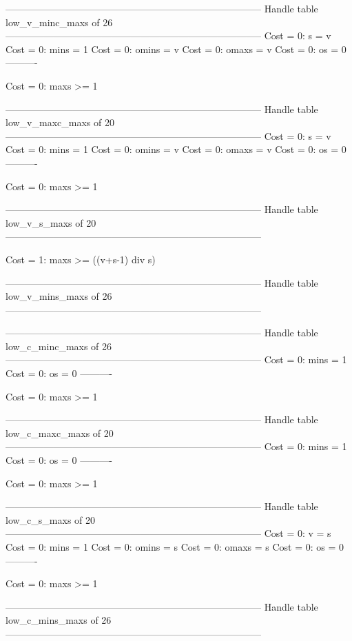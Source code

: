 --------------------------------------------------------------------------------
Handle table low_v_minc_maxs of 26
--------------------------------------------------------------------------------
Cost =  0:  s     = v
Cost =  0:  mins  = 1
Cost =  0:  omins = v
Cost =  0:  omaxs = v
Cost =  0:  os    = 0
----------

Cost =  0:  maxs >= 1

--------------------------------------------------------------------------------
Handle table low_v_maxc_maxs of 20
--------------------------------------------------------------------------------
Cost =  0:  s     = v
Cost =  0:  mins  = 1
Cost =  0:  omins = v
Cost =  0:  omaxs = v
Cost =  0:  os    = 0
----------

Cost =  0:  maxs >= 1

--------------------------------------------------------------------------------
Handle table low_v_s_maxs of 20
--------------------------------------------------------------------------------

Cost =  1:  maxs >= ((v+s-1) div s)

--------------------------------------------------------------------------------
Handle table low_v_mins_maxs of 26
--------------------------------------------------------------------------------


--------------------------------------------------------------------------------
Handle table low_c_minc_maxs of 26
--------------------------------------------------------------------------------
Cost =  0:  mins = 1
Cost =  0:  os   = 0
----------

Cost =  0:  maxs >= 1

--------------------------------------------------------------------------------
Handle table low_c_maxc_maxs of 20
--------------------------------------------------------------------------------
Cost =  0:  mins = 1
Cost =  0:  os   = 0
----------

Cost =  0:  maxs >= 1

--------------------------------------------------------------------------------
Handle table low_c_s_maxs of 20
--------------------------------------------------------------------------------
Cost =  0:  v     = s
Cost =  0:  mins  = 1
Cost =  0:  omins = s
Cost =  0:  omaxs = s
Cost =  0:  os    = 0
----------

Cost =  0:  maxs >= 1

--------------------------------------------------------------------------------
Handle table low_c_mins_maxs of 26
--------------------------------------------------------------------------------

